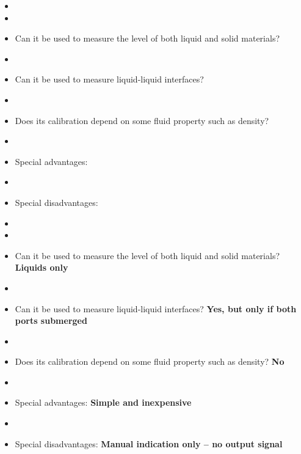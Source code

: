\vskip 10pt

\begin{itemize}
\goodbreak
\item{} 
\item\item{} Can it be used to measure the level of both liquid and solid materials?
\item\item{} Can it be used to measure liquid-liquid interfaces?
\item\item{} Does its calibration depend on some fluid property such as density?
\item\item{} Special advantages:
\item\item{} Special disadvantages:
\end{itemize}







\begin{itemize}
\goodbreak
\item{} 
\item\item{} Can it be used to measure the level of both liquid and solid materials? {\bf Liquids only}
\item\item{} Can it be used to measure liquid-liquid interfaces? {\bf Yes, but only if both ports submerged}
\item\item{} Does its calibration depend on some fluid property such as density? {\bf No}
\item\item{} Special advantages: {\bf Simple and inexpensive}
\item\item{} Special disadvantages: {\bf Manual indication only -- no output signal}
\end{itemize}

\vskip 10pt

